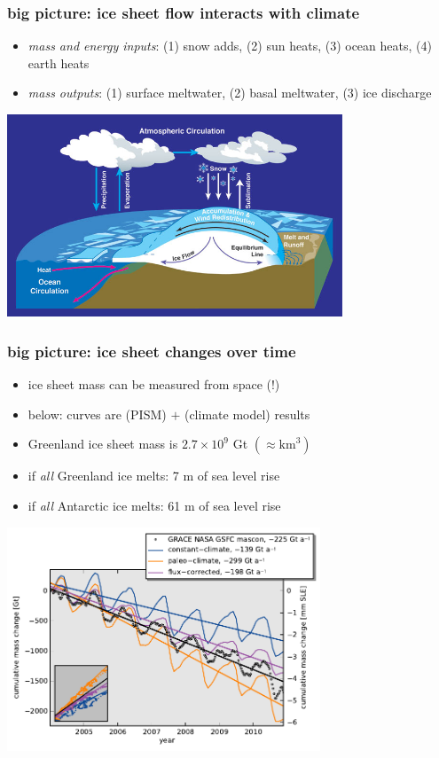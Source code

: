 \documentclass{beamer}
\begin{document}
\begin{frame}
  \frametitle{big picture: ice sheet flow interacts with climate}

\medskip
\small
\begin{itemize}
\item \emph{mass and energy inputs}: (1) snow adds, (2) sun heats, (3) ocean heats, (4) earth heats
\item \emph{mass outputs}: (1) surface meltwater, (2) basal meltwater, (3) ice discharge
\end{itemize}

\begin{center}
  \includegraphics[width=0.75\textwidth]{mass-bal-atmos}
\end{center}
\end{frame}


\begin{frame}
  \frametitle{big picture: ice sheet changes over time}

\small
\begin{itemize}
\item ice sheet mass can be measured from space (!)
\item below: curves are (PISM) $+$ (climate model) results
\item  Greenland ice sheet mass is $2.7 \times 10^9$ Gt \quad $(\approx \text{km}^3)$ %
\item  if \emph{all} Greenland ice melts: 7 m of sea level rise
\item  if \emph{all} Antarctic ice melts: 61 m of sea level rise
\end{itemize}
\normalsize

\begin{center}
    \includegraphics[width=0.7\textwidth]{ts_mass_2004-2010}
\end{center}
\end{frame}
\end{document}
